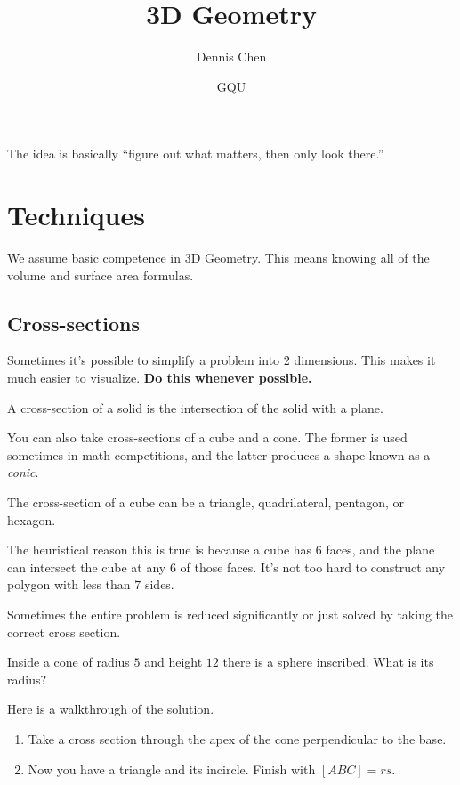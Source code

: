 \documentclass{article}
\title{3D Geometry}
\author{Dennis Chen}
\date{GQU}
\begin{document}
\maketitle

The idea is basically “figure out what matters, then only look there.”
\section{Techniques}
We assume basic competence in 3D Geometry. This means knowing all of the volume and surface area formulas.

\subsection{Cross-sections}
Sometimes it's possible to simplify a problem into 2 dimensions. This makes it much easier to visualize. \textbf{Do this whenever possible.}

\begin{defi}
A cross-section of a solid is the intersection of the solid with a plane.
\end{defi}

You can also take cross-sections of a cube and a cone. The former is used sometimes in math competitions, and the latter produces a shape known as a \textit{conic}.

\begin{theo}
The cross-section of a cube can be a triangle, quadrilateral, pentagon, or hexagon.
\end{theo}

The heuristical reason this is true is because a cube has $6$ faces, and the plane can intersect the cube at any $6$ of those faces. It's not too hard to construct any polygon with less than $7$ sides.

Sometimes the entire problem is reduced significantly or just solved by taking the correct cross section.

\begin{exam}
Inside a cone of radius $5$ and height $12$ there is a sphere inscribed. What is its radius?
\end{exam}
\begin{sol}
Here is a walkthrough of the solution.
\begin{enumerate}
    \item Take a cross section through the apex of the cone perpendicular to the base.
    
    \item Now you have a triangle and its incircle. Finish with $[ABC]=rs.$
\end{enumerate}
\end{sol}
\end{document}
